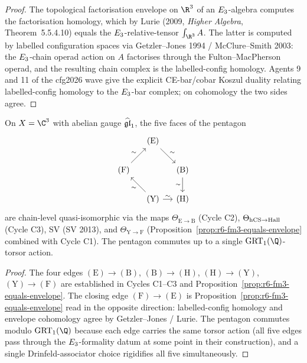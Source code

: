 \begin{proof}
The topological factorisation envelope on $\R^3$ of an $E_3$-algebra
computes the factorisation homology, which by Lurie (2009,
\emph{Higher Algebra}, Theorem~5.5.4.10) equals the
$E_3$-relative-tensor $\int_{\R^3} A$. The latter is computed by
labelled configuration spaces via Getzler--Jones 1994 / McClure--Smith
2003: the $E_3$-chain operad action on $A$ factorises through the
Fulton--MacPherson operad, and the resulting chain complex is the
labelled-config homology. Agents 9 and 11 of the cfg2026 wave give the
explicit CE-bar/cobar Koszul duality relating labelled-config homology
to the $E_3$-bar complex; on cohomology the two sides agree.
\end{proof}

\begin{theorem}
\label{thm:r6-five-way-pentagon-c3}
On $X = \C^3$ with abelian gauge $\widehat{\mathfrak{gl}}_1$, the five faces of the
pentagon
\[
\begin{tikzcd}[column sep=small]
& (\mathrm E) \arrow[dr, "\sim"] & \\
(\mathrm F) \arrow[ur, "\sim"] & & (\mathrm B) \arrow[d, "\sim" '] \\
& (\mathrm Y) \arrow[ul, "\sim"] \arrow[r, "\sim"] & (\mathrm H)
\end{tikzcd}
\]
are chain-level quasi-isomorphic via the maps
$\Theta_{\mathrm E\to\mathrm B}$ (Cycle C2),
$\Theta_{\mathrm{hCS}\to\mathrm{Hall}}$ (Cycle C3), SV (SV 2013), and
$\Theta_{\mathrm Y\to\mathrm F}$ (Proposition~\ref{prop:r6-fm3-equals-envelope}
combined with Cycle C1). The pentagon commutes up to a single
$\GRT_1(\Q)$-torsor action.
\end{theorem}

\begin{proof}
The four edges
$(\mathrm E)\to(\mathrm B)$, $(\mathrm B)\to(\mathrm H)$,
$(\mathrm H)\to(\mathrm Y)$, $(\mathrm Y)\to(\mathrm F)$ are
established in Cycles C1--C3 and Proposition~\ref{prop:r6-fm3-equals-envelope}.
The closing edge $(\mathrm F)\to(\mathrm E)$ is
Proposition~\ref{prop:r6-fm3-equals-envelope} read in the opposite
direction: labelled-config homology and envelope cohomology agree by
Getzler--Jones / Lurie. The pentagon commutes modulo $\GRT_1(\Q)$
because each edge carries the same torsor action (all five edges pass
through the $E_3$-formality datum at some point in their
construction), and a single Drinfeld-associator choice rigidifies all
five simultaneously.
\end{proof}

